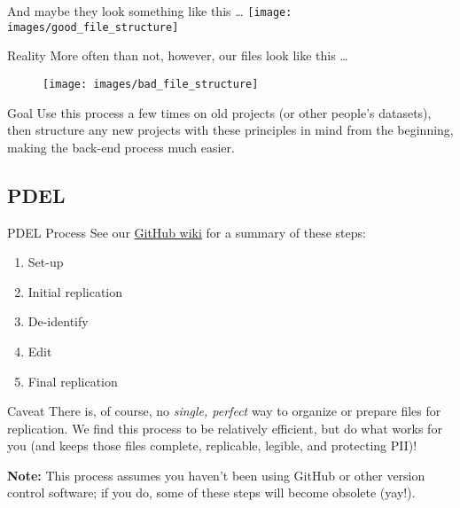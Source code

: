 \documentclass[12pt, compress]{beamer} %
\let\olditem\item %
\renewcommand{\item}{%
\olditem\vspace{\fill}}
\begin{document}
	\begin{frame}
		\centering And maybe they look something like this \dots 
		\vspace{10pt}
		\centering \texttt{[image: images/good\_file\_structure]}
	\end{frame}

	\begin{frame}{Reality}
		\centering
		More often than not, however, our files look like this \dots
		\vspace{10pt}
		\begin{figure}[H]
		  \texttt{[image: images/bad\_file\_structure]}
		\end{figure}
	\end{frame}	

	\begin{frame}{Goal}
		Use this process a few times on old projects (or other people's datasets), then structure any new projects with these principles in mind from the beginning, making the back-end process much easier.
	\end{frame}

\subsection{PDEL}

	\begin{frame}{PDEL Process}
		See our \href{https://github.com/PolicyDesignEvaluationLab/Transparency-Initiative/wiki/PDEL-Data-Transparency-Services-Workflow}{GitHub wiki} for a summary of these steps:
		
		\begin{enumerate}
			\item Set-up
			\item Initial replication
			\item De-identify
			\item Edit
			\item Final replication
		\end{enumerate}
	\bigskip
				
	\end{frame}	

	\begin{frame}{Caveat}
		There is, of course, no \textit{single, perfect} way to organize or prepare files for replication. We find this process to be relatively efficient, but do what works for you (and keeps those files complete, replicable, legible, and protecting PII)!
	
		\bigskip
		
		\textbf{Note:} This process assumes you haven't been using GitHub or other version control software; if you do, some of these steps will become obsolete (yay!).
	\end{frame}
\end{document}
